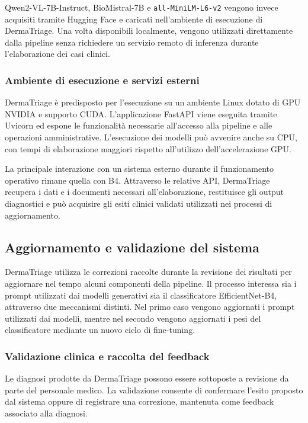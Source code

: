 Qwen2-VL-7B-Instruct, BioMistral-7B e \texttt{all-MiniLM-L6-v2} vengono invece acquisiti tramite Hugging Face e caricati nell'ambiente di esecuzione di DermaTriage. Una volta disponibili localmente, vengono utilizzati direttamente dalla pipeline senza richiedere
un servizio remoto di inferenza durante l'elaborazione dei casi clinici.

\subsubsection{Ambiente di esecuzione e servizi esterni}
DermaTriage è predisposto per l'esecuzione su un ambiente Linux dotato di GPU NVIDIA e supporto CUDA. L'applicazione FastAPI viene eseguita tramite Uvicorn ed espone le funzionalità necessarie all'accesso alla pipeline e alle operazioni amministrative. L'esecuzione dei modelli può avvenire anche su CPU, con tempi di elaborazione maggiori rispetto all'utilizzo dell'accelerazione GPU.

La principale interazione con un sistema esterno durante il funzionamento operativo rimane quella con B4. Attraverso le relative API, DermaTriage recupera i dati e i documenti necessari all'elaborazione, restituisce gli output diagnostici e può acquisire gli esiti clinici validati utilizzati nei processi di aggiornamento.

\subsection{Aggiornamento e validazione del sistema}
DermaTriage utilizza le correzioni raccolte durante la revisione dei risultati per aggiornare nel tempo alcuni componenti della pipeline. Il processo interessa sia i prompt utilizzati dai modelli generativi sia il classificatore EfficientNet-B4, attraverso due meccanismi distinti. Nel primo caso vengono aggiornati i prompt utilizzati dai modelli, mentre nel secondo vengono aggiornati i pesi del classificatore mediante un nuovo ciclo di fine-tuning.

\subsubsection{Validazione clinica e raccolta del feedback}
Le diagnosi prodotte da DermaTriage possono essere sottoposte a revisione da parte del personale medico. La validazione consente di confermare l'esito proposto dal sistema oppure di registrare una correzione, mantenuta come feedback associato alla diagnosi.

